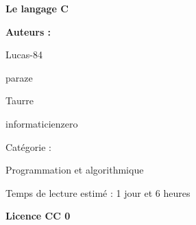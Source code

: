 \begin{titlepage}
\parindent=0pt

\begin{center}\sffamily\bfseries\Huge
Le langage C
\end{center}

\vspace*{5cm}
\begin{center}\sffamily\bfseries\LARGE
Auteurs :

    Lucas-84
    
    paraze
    
    Taurre
    
    informaticienzero
    
\end{center}

\vspace*{6cm}

\begin{center}\sffamily\bfseries\Large

Catégorie :

    Programmation et algorithmique 


Temps de lecture estimé : 1 jour et 6 heures
\end{center}

\vspace*{1cm}

\begin{center}\sffamily\bfseries\large
Licence CC 0
\end{center}

\end{titlepage}